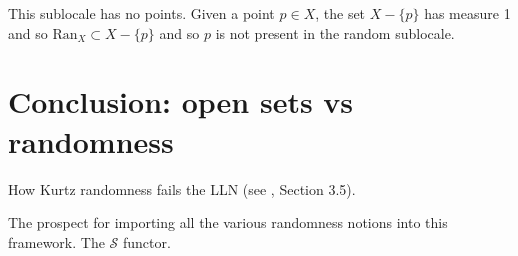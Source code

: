 \documentclass[12pt]{extarticle}
\newcommand{\ran}{\ensuremath{\mathrm{Ran}}}
\begin{document}
This sublocale has no points. Given a point $p\in X$, the set $X-\{p\}$ has measure 1 and so $\ran_X\subset X-\{p\}$ and so $p$ is not present in the random sublocale.

\section{Conclusion: open sets vs randomness}
How Kurtz randomness fails the LLN (see \cite{NiesAndre2009CaR}, Section 3.5). 

The prospect for importing all the various randomness notions into this framework. The $\mathcal{S}$ functor.

\begin{comment}
Paper: locale theory
- Is the relationship between nucleus and quotient always just that each set gets mapped to its value under the nucleus? The nucleus map is the quotient map?
- Ran, the sublocale of random points
- presumably we can say some class of functions are smooth on this sublocale?
- Porter provides some justification for the locale approach since it's "all measure 1 properties"
- are there countable bounds on the collections, in the locale theory?
- given some notion of randomness, the interval [0,1] can be given the corresponding locale structure
- does this mean that each notion of randomness has its own topology? or are the topologies the same just with different numbers of points, and different Ran? (must be a different topology, right? because once you have a point you have an ideal of open sets, else not)
- what corresponds to the different amounts of computability and/or martingale bounds?
- will the punch line be that the locale approach is agnostic to which definition of randomness we work with, but simply takes any of the notions and removes random points from the space?
- how does the existence of a universal ML test play out in locales?
- the a.e. results like "if f is nondecreasing then it is smooth at every computable random" feel like statements about cohesion, and this feels natural in the locale interpretation
- she is saying that Birkhoff Ergodicity theorem, suitably effectivized, holds at ML randoms, i.e. the same set that functions of bounded variation are smooth at -- making them "equally strong". But in another sense these are different topologies on R and so we can also say that given this topology these are the classes of functions.
- Church's thesis that there are no non-computable reals -- has a natural home here.
\end{comment}


\end{document}
